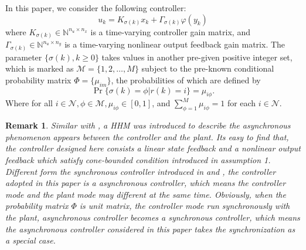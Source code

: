\documentclass[conference]{IEEEtran}
\newtheorem{remark}{Remark}
\begin{document}
In this paper, we consider the following controller:
\begin{equation}\label{asycontroller}
u_k=K_{\sigma(k)}x_k+\varGamma_{\sigma(k)}\varphi(y_k) 
\end{equation}
where $K_{\sigma(k)}\in \mathbb{N}^{n_u\times n_x}$ is a time-varying controller gain matrix, and $\varGamma_{\sigma(k)}\in \mathbb{N}^{n_u\times n_y}$ is a time-varying nonlinear output feedback gain matrix. The parameter $\{\sigma(k),k\geq0\}$ takes values in another pre-given positive integer set, which is marked as $\mathcal{M}=\{1,2,\dots,M\}$ subject to the pre-known conditional probability matrix $\varPhi=\{\mu_{im} \}$, the probabilities of which are defined by
\begin{equation}
\Pr\{\sigma(k)=\phi|r(k)=i\}=\mu_{i\phi}.
\end{equation}
Where for all $i\in\mathcal{N}, \phi\in\mathcal{M}, \mu_{i\phi}\in [0,1]$, and $\sum_{\phi=1}^{M}\mu_{i\phi}=1$ for each $i\in\mathcal{N}$.
\begin{remark}
	Similar with \cite{passive_wu}, a HHM was introduced to describe the asynchronous phenomenon appears between the controller and the plant. Its easy to find that, the controller designed here consists a linear state feedback and a nonlinear output feedback which satisfy cone-bounded condition introduced in assumption 1. Different form the synchronous controller introduced in \cite{song_control} and \cite{costaolv_control_1}, the controller adopted in this paper is a asynchronous controller, which means the controller mode and the plant mode may different at the same time. Obviously, when the probability matrix $\varPhi$ is unit matrix, the controller mode run synchronously with the plant, asynchronous controller becomes a synchronous controller, which means the asynchronous controller considered in this paper takes the synchronization as a special case. 
\end{remark} 
\end{document}
